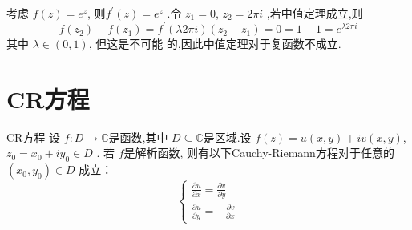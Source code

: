 \documentclass[../../复变函数.tex]{subfiles}
\begin{document}
\hspace*{\fill} 


\begin{example}[  微分中值定理未必成立]
考虑 \(  f\left( z \right)= e^{z}   \), 则\(  f^{\prime} \left( z \right)= e^{z}   \)  .令 \(  z_1= 0  \), \(  z_2= 2\pi i  \) ,若中值定理成立,则 \[
f\left( z_2 \right)-f\left( z_1 \right)= f^{\prime} \left(  \lambda  2\pi i \right)\left( z_2-z_1 \right)   =  0 = 1-1 =  e^{  \lambda  2 \pi i}  
\]  其中 \(   \lambda \in \left( 0,1 \right)   \), 但这是不可能 的,因此中值定理对于复函数不成立.
\end{example}

\hspace*{\fill} 


\section{CR方程}
\begin{theorem}{CR方程}
    设 \(  f:D\to \mathbb{C}   \)是函数,其中 \(  D\subseteq \mathbb{C}   \)是区域.设 \(  f\left( z \right)= u\left( x,y \right)+ i v\left( x,y \right)     \), \(  z_0 =  x_0+ iy_0 \in D  \) .
    若 \(  f  \)是解析函数, 则有以下Cauchy-Riemann方程对于任意的\(  \left( x_0,y_0 \right)\in D   \) 成立： \[
    \begin{cases} \frac{\partial u}{\partial x}= \frac{\partial v}{\partial y}\\ 
     \frac{\partial u}{\partial y}= - \frac{\partial v}{\partial x} \end{cases} 
    \]
\end{theorem}
\end{document}
